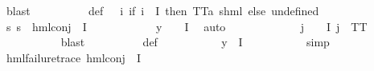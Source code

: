 \begin{isabellebody}
\ blast\isanewline
\ \ \ \ \ \ \isamarkupfalse%
\ {\isasymPsi}\ \ {\isasymPsi}{\isacharunderscore}{\kern0pt}def{\isacharcolon}{\kern0pt}\ {\isachardoublequoteopen}{\isasymPsi}\ {\isacharequal}{\kern0pt}\ {\isacharparenleft}{\kern0pt}{\isasymlambda}i{\isachardot}{\kern0pt}\ {\isacharparenleft}{\kern0pt}if\ i\ {\isasymin}\ I\ then\ {\isacharparenleft}{\kern0pt}TT{\isacharcolon}{\kern0pt}{\isacharcolon}{\kern0pt}{\isacharparenleft}{\kern0pt}{\isacharprime}{\kern0pt}a{\isacharcomma}{\kern0pt}\ {\isacharprime}{\kern0pt}s{\isacharparenright}{\kern0pt}hml{\isacharparenright}{\kern0pt}\ else\ undefined{\isacharparenright}{\kern0pt}{\isacharparenright}{\kern0pt}{\isachardoublequoteclose}\isanewline
\ \ \ \ \ \ \isamarkupfalse%
\ {\isachardoublequoteopen}{\isasymforall}s{\isachardot}{\kern0pt}\ {\isasymnot}s\ {\isasymTurnstile}\ {\isacharparenleft}{\kern0pt}hml{\isacharunderscore}{\kern0pt}conj\ {\isacharbraceleft}{\kern0pt}{\isacharbraceright}{\kern0pt}\ I\ {\isasymPsi}{\isacharparenright}{\kern0pt}{\isachardoublequoteclose}\ \isanewline
\ \ \ \ \ \ \ \ \isamarkupfalse%
\ {\isacartoucheopen}y\ {\isasymin}\ {\isasymPhi}\ {\isacharbackquote}{\kern0pt}\ I{\isacartoucheclose}\ \isamarkupfalse%
\ auto\isanewline
\ \ \ \ \ \ \isamarkupfalse%
\ {\isachardoublequoteopen}{\isasymPsi}\ {\isacharbackquote}{\kern0pt}\ {\isacharbraceleft}{\kern0pt}{\isacharbraceright}{\kern0pt}\ {\isacharequal}{\kern0pt}\ {\isacharbraceleft}{\kern0pt}{\isacharbraceright}{\kern0pt}{\isachardoublequoteclose}\ {\isachardoublequoteopen}{\isasymforall}j\ {\isasymin}\ {\isasymPsi}\ {\isacharbackquote}{\kern0pt}\ I{\isachardot}{\kern0pt}\ j\ {\isacharequal}{\kern0pt}\ TT{\isachardoublequoteclose}\ \isanewline
\ \ \ \ \ \ \ \ \ \isamarkupfalse%
\ blast\isanewline
\ \ \ \ \ \ \ \ \isamarkupfalse%
\ {\isasymPsi}{\isacharunderscore}{\kern0pt}def\ \isanewline
\ \ \ \ \ \ \ \ \isamarkupfalse%
\ {\isacartoucheopen}y\ {\isasymin}\ {\isasymPhi}{\isacharbackquote}{\kern0pt}I{\isacartoucheclose}\ \isanewline
\ \ \ \ \ \ \ \ \isamarkupfalse%
\ simp\isanewline
\ \ \ \ \ \ \isamarkupfalse%
\ {\isachardoublequoteopen}hml{\isacharunderscore}{\kern0pt}failure{\isacharunderscore}{\kern0pt}trace\ {\isacharparenleft}{\kern0pt}hml{\isacharunderscore}{\kern0pt}conj\ {\isacharbraceleft}{\kern0pt}{\isacharbraceright}{\kern0pt}\ I\ {\isasymPsi}{\isacharparenright}{\kern0pt}{\isachardoublequoteclose}\ \isanewline
\ \ \ \ \ \ \ \ \isamarkupfalse%

\end{isabellebody}
